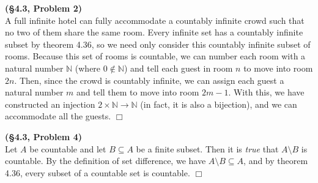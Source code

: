 \documentclass[12pt]{article}
\theoremstyle{definition}
\newenvironment{Solution}{\noindent {\sc Solution.}}{$\Box$ \vspace{2 ex}}
\begin{document}
\begin{Solution}
{\bf (\S4.3, Problem 2)}\\
A full infinite hotel can fully accommodate a countably infinite crowd such that no two of them share the same room. Every infinite set has a countably infinite subset by theorem 4.36, so we need only consider this countably infinite subset of rooms. Because this set of rooms is countable, we can number each room with a natural number $\mathbb N$ (where $0 \not \in \mathbb N$) and tell each guest in room $n$ to move into room $2n$. Then, since the crowd is countably infinite, we can assign each guest a natural number $m$ and tell them to move into room $2m-1$. With this, we have constructed an injection $2 \times \mathbb N \to \mathbb N$ (in fact, it is also a bijection), and we can accommodate all the guests.
\end{Solution}

\vspace{0.5cm}

\begin{Solution}
{\bf (\S4.3, Problem 4)}\\
Let $A$ be countable and let $B \subseteq A$ be a finite subset. Then it is \textit{true} that $A\setminus B$ is countable. By the definition of set difference, we have $A\setminus B \subseteq A$, and by theorem 4.36, every subset of a countable set is countable. 
\end{Solution}

\vspace{0.5cm}
\end{document}
